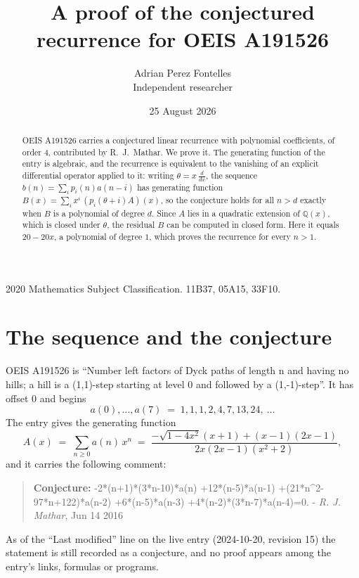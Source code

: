 \documentclass[11pt,a4paper]{article}
\title{A proof of the conjectured recurrence for OEIS A191526}
\author{Adrian Perez Fontelles\\ \small Independent researcher}
\date{25 August 2026}
\theoremstyle{plain}
\theoremstyle{definition}
\begin{document}
\maketitle

\begin{abstract}
OEIS A191526 carries a conjectured linear recurrence with polynomial coefficients, of
order 4, contributed by R.~J.~Mathar. We prove it. The generating function of the
entry is algebraic, and the recurrence is equivalent to the vanishing of an explicit
differential operator applied to it: writing $\theta=x\,\frac{d}{dx}$, the sequence
$b(n)=\sum_{i}p_{i}(n)a(n-i)$ has generating function
$B(x)=\sum_{i}x^{i}\,(p_{i}(\theta+i)A)(x)$, so the conjecture holds for all $n>d$ exactly
when $B$ is a polynomial of degree $d$. Since $A$ lies in a quadratic extension of
$\mathbb{Q}(x)$, which is closed under $\theta$, the residual $B$ can be computed in
closed form. Here it equals $20 - 20 x$, a polynomial of degree $1$, which proves
the recurrence for every $n>1$.
\end{abstract}

\noindent\small 2020 Mathematics Subject Classification. 11B37, 05A15, 33F10.\normalsize

\section{The sequence and the conjecture}

OEIS A191526 is ``Number left factors of Dyck paths of length n and having no hills; a hill is a (1,1)-step starting at level 0 and followed by a (1,-1)-step''. It has offset $0$ and begins
\[
a(0),\dots,a(7)\;=\;1, 1, 1, 2, 4, 7, 13, 24,\ \dots
\]
The entry gives the generating function
\begin{equation}\label{eq:gf}
A(x)\;=\;\sum_{n\ge 0} a(n)\,x^{n}\;=\;\frac{- \sqrt{1 - 4 x^{2}} \left(x + 1\right) + \left(x - 1\right) \left(2 x - 1\right)}{2 x \left(2 x - 1\right) \left(x^{2} + 2\right)} ,
\end{equation}
and it carries the following comment:
\begin{quote}\small
\textbf{Conjecture:} -2*(n+1)*(3*n-10)*a(n) +12*(n-5)*a(n-1) +(21*n\^{}2-97*n+122)*a(n-2) +6*(n-5)*a(n-3) +4*(n-2)*(3*n-7)*a(n-4)=0. - \emph{R. J. Mathar}, Jun 14 2016
\end{quote}
As of the ``Last modified'' line on the live entry (2024-10-20, revision 15) the
statement is still recorded as a conjecture, and no proof appears among the entry's links,
formulas or programs.
\end{document}
